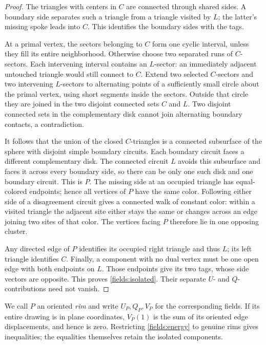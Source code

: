 \begin{proof}
The triangles with centers in $C$ are connected through shared sides.
A boundary side separates such a triangle from a triangle visited by $L$;
the latter's missing spoke leads into $C$.  This identifies the boundary
sides with the tags.

At a primal vertex, the sectors belonging to $C$ form one cyclic interval,
unless they fill its entire neighborhood.  Otherwise choose two separated
runs of $C$-sectors.  Each intervening interval contains an $L$-sector: an
immediately adjacent untouched triangle would still connect to $C$.
Extend two selected $C$-sectors and two intervening $L$-sectors to alternating
points of a sufficiently small circle about the primal vertex, using short
segments inside the sectors.  Outside that circle they are joined in the
two disjoint connected sets $C$ and $L$.  Two disjoint connected sets in
the complementary disk cannot join alternating boundary contacts, a
contradiction.

It follows that the union of the closed $C$-triangles is a connected
subsurface of the sphere with disjoint simple boundary circuits.  Each
boundary circuit faces a different complementary disk.  The connected
circuit $L$ avoids this subsurface and faces it across every boundary side,
so there can be only one such disk and one boundary circuit.  This is $P$.
The missing side at an occupied triangle has equal-colored endpoints;
hence all vertices of $P$ have the same color.  Following either side of a
disagreement circuit gives a connected walk of constant color: within a
visited triangle the adjacent site either stays the same or changes across
an edge joining two sites of that color.  The vertices facing $P$ therefore
lie in one opposing cluster.

Any directed edge of $P$ identifies its occupied right triangle and thus
$L$; its left triangle identifies $C$.  Finally, a component with no dual
vertex must be one open edge with both endpoints on $L$.  Those endpoints
give its two tags, whose side vectors are opposite.  This proves
\eqref{fields:isolated}.  Their separate $U$- and $Q$-contributions need not
vanish.
\end{proof}

We call $P$ an oriented \emph{rim} and write $U_P,Q_P,V_P$ for the
corresponding fields.  If its entire drawing is in plane coordinates,
$V_P(1)$ is the sum of its oriented edge displacements, and hence is zero.
Restricting \eqref{fields:energy} to genuine rims gives inequalities; the
equalities themselves retain the isolated components.

